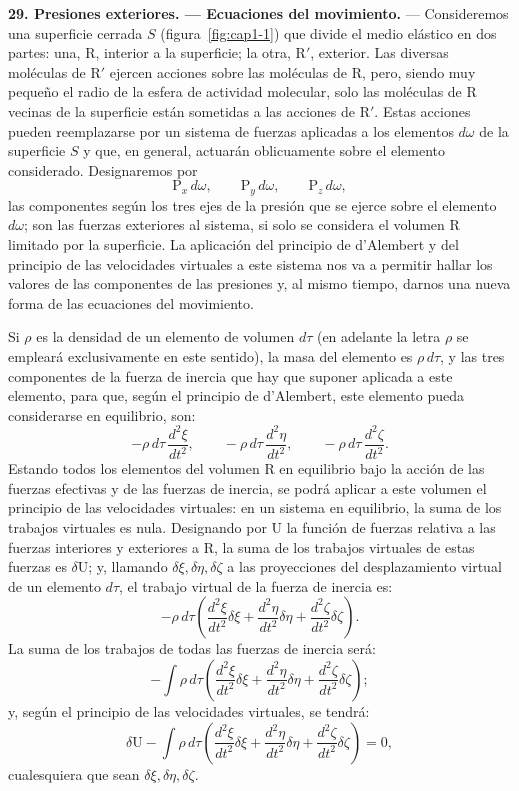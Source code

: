 \noindent\textbf{29. Presiones exteriores. — Ecuaciones del movimiento.} —
Consideremos una superficie cerrada $S$ (figura~\ref{fig:cap1-1}) que
divide el medio elástico en dos partes: una, $\mathrm{R}$, interior a la
superficie; la otra, $\mathrm{R}'$, exterior. Las diversas moléculas de
$\mathrm{R}'$ ejercen acciones sobre las moléculas de $\mathrm{R}$, pero,
siendo muy pequeño el radio de la esfera de actividad molecular, solo las
moléculas de $\mathrm{R}$ vecinas de la superficie están sometidas a las
acciones de $\mathrm{R}'$. Estas acciones pueden reemplazarse por un
sistema de fuerzas aplicadas a los elementos $d\omega$ de la superficie
$S$ y que, en general, actuarán oblicuamente sobre el elemento
considerado. Designaremos por
\[
\mathrm{P}_x\,d\omega,\qquad \mathrm{P}_y\,d\omega,\qquad \mathrm{P}_z\,d\omega,
\]
las componentes según los tres ejes de la presión que se ejerce sobre el
elemento $d\omega$; son las fuerzas exteriores al sistema, si solo se
considera el volumen $\mathrm{R}$ limitado por la superficie. La aplicación
del principio de d'Alembert y del principio de las velocidades virtuales a
este sistema nos va a permitir hallar los valores de las componentes de las
presiones y, al mismo tiempo, darnos una nueva forma de las ecuaciones del
movimiento.

Si $\rho$ es la densidad de un elemento de volumen $d\tau$ (en adelante la
letra $\rho$ se empleará exclusivamente en este sentido), la masa del
elemento es $\rho\,d\tau$, y las tres componentes de la fuerza de inercia
que hay que suponer aplicada a este elemento, para que, según el principio
de d'Alembert, este elemento pueda considerarse en equilibrio, son:
\[
-\rho\,d\tau\,\frac{d^2\xi}{dt^2},\qquad -\rho\,d\tau\,\frac{d^2\eta}{dt^2},
\qquad -\rho\,d\tau\,\frac{d^2\zeta}{dt^2}.
\]
Estando todos los elementos del volumen $\mathrm{R}$ en equilibrio bajo la
acción de las fuerzas efectivas y de las fuerzas de inercia, se podrá
aplicar a este volumen el principio de las velocidades virtuales: en un
sistema en equilibrio, la suma de los trabajos virtuales es nula.
Designando por $\mathrm{U}$ la función de fuerzas relativa a las fuerzas
interiores y exteriores a $\mathrm{R}$, la suma de los trabajos virtuales
de estas fuerzas es $\delta\mathrm{U}$; y, llamando $\delta\xi,\delta\eta,
\delta\zeta$ a las proyecciones del desplazamiento virtual de un elemento
$d\tau$, el trabajo virtual de la fuerza de inercia es:
\[
-\rho\,d\tau\left(\frac{d^2\xi}{dt^2}\delta\xi+\frac{d^2\eta}{dt^2}\delta\eta+\frac{d^2\zeta}{dt^2}\delta\zeta\right).
\]
La suma de los trabajos de todas las fuerzas de inercia será:
\[
-\int \rho\,d\tau\left(\frac{d^2\xi}{dt^2}\delta\xi+\frac{d^2\eta}{dt^2}\delta\eta+\frac{d^2\zeta}{dt^2}\delta\zeta\right);
\]
y, según el principio de las velocidades virtuales, se tendrá:
\begin{equation}
\delta\mathrm{U}-\int \rho\,d\tau\left(\frac{d^2\xi}{dt^2}\delta\xi+\frac{d^2\eta}{dt^2}\delta\eta+\frac{d^2\zeta}{dt^2}\delta\zeta\right)=0,
\tag{33}
\end{equation}
cualesquiera que sean $\delta\xi,\delta\eta,\delta\zeta$.


